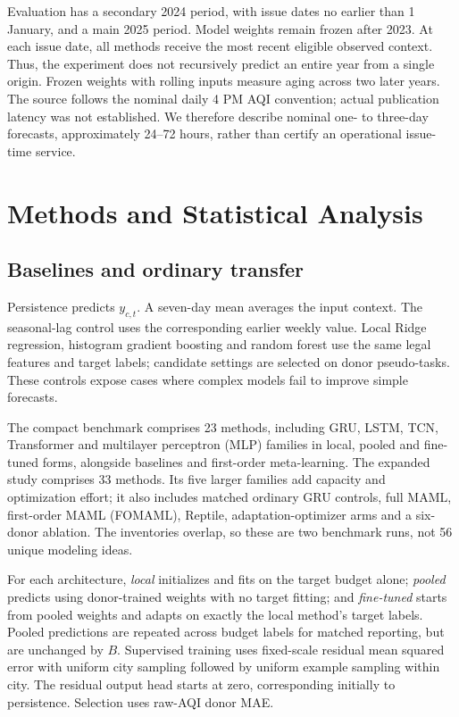 \documentclass[conference]{IEEEtran}
\begin{document}
Evaluation has a secondary 2024 period, with issue dates no earlier than 1 January, and a main 2025 period. Model weights remain frozen after 2023. At each issue date, all methods receive the most recent eligible observed context. Thus, the experiment does not recursively predict an entire year from a single origin. Frozen weights with rolling inputs measure aging across two later years. The source follows the nominal daily 4 PM AQI convention; actual publication latency was not established. We therefore describe nominal one- to three-day forecasts, approximately 24--72 hours, rather than certify an operational issue-time service.

\section{Methods and Statistical Analysis}
\subsection{Baselines and ordinary transfer}
Persistence predicts $y_{c,t}$. A seven-day mean averages the input context. The seasonal-lag control uses the corresponding earlier weekly value. Local Ridge regression, histogram gradient boosting and random forest use the same legal features and target labels; candidate settings are selected on donor pseudo-tasks. These controls expose cases where complex models fail to improve simple forecasts.

The compact benchmark comprises 23 methods, including GRU, LSTM, TCN, Transformer and multilayer perceptron (MLP) families in local, pooled and fine-tuned forms, alongside baselines and first-order meta-learning. The expanded study comprises 33 methods. Its five larger families add capacity and optimization effort; it also includes matched ordinary GRU controls, full MAML, first-order MAML (FOMAML), Reptile, adaptation-optimizer arms and a six-donor ablation. The inventories overlap, so these are two benchmark runs, not 56 unique modeling ideas.

For each architecture, \emph{local} initializes and fits on the target budget alone; \emph{pooled} predicts using donor-trained weights with no target fitting; and \emph{fine-tuned} starts from pooled weights and adapts on exactly the local method's target labels. Pooled predictions are repeated across budget labels for matched reporting, but are unchanged by $B$. Supervised training uses fixed-scale residual mean squared error with uniform city sampling followed by uniform example sampling within city. The residual output head starts at zero, corresponding initially to persistence. Selection uses raw-AQI donor MAE.
\end{document}
